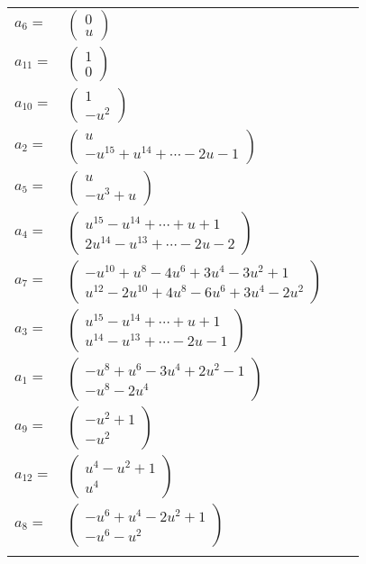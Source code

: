 \documentclass[1p]{elsarticle_modified}
\theoremstyle{definition}
\begin{document}
\begin{tabular}{m{7pt} m{180pt} m{7pt} m{180pt} }
\flushright $a_{6}=$&$\begin{pmatrix}0\\u\end{pmatrix}$ \\
\flushright $a_{11}=$&$\begin{pmatrix}1\\0\end{pmatrix}$ \\
\flushright $a_{10}=$&$\begin{pmatrix}1\\- u^2\end{pmatrix}$ \\
\flushright $a_{2}=$&$\begin{pmatrix}u\\- u^{15}+u^{14}+\cdots-2 u-1\end{pmatrix}$ \\
\flushright $a_{5}=$&$\begin{pmatrix}u\\- u^3+u\end{pmatrix}$ \\
\flushright $a_{4}=$&$\begin{pmatrix}u^{15}- u^{14}+\cdots+u+1\\2 u^{14}- u^{13}+\cdots-2 u-2\end{pmatrix}$ \\
\flushright $a_{7}=$&$\begin{pmatrix}- u^{10}+u^8-4 u^6+3 u^4-3 u^2+1\\u^{12}-2 u^{10}+4 u^8-6 u^6+3 u^4-2 u^2\end{pmatrix}$ \\
\flushright $a_{3}=$&$\begin{pmatrix}u^{15}- u^{14}+\cdots+u+1\\u^{14}- u^{13}+\cdots-2 u-1\end{pmatrix}$ \\
\flushright $a_{1}=$&$\begin{pmatrix}- u^8+u^6-3 u^4+2 u^2-1\\- u^8-2 u^4\end{pmatrix}$ \\
\flushright $a_{9}=$&$\begin{pmatrix}- u^2+1\\- u^2\end{pmatrix}$ \\
\flushright $a_{12}=$&$\begin{pmatrix}u^4- u^2+1\\u^4\end{pmatrix}$ \\
\flushright $a_{8}=$&$\begin{pmatrix}- u^6+u^4-2 u^2+1\\- u^6- u^2\end{pmatrix}$\\&\end{tabular}
\end{document}
